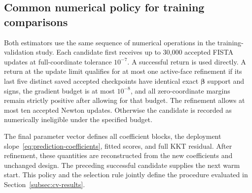 \subsection{Common numerical policy for training comparisons}
\label{subsec:training-solver-policy}
Both estimators use the same sequence of numerical operations in the training-validation study. Each candidate first receives up to 30,000 accepted FISTA updates at full-coordinate tolerance $10^{-7}$. A successful return is used directly. A return at the update limit qualifies for at most one active-face refinement if its last five distinct saved accepted checkpoints have identical exact $\bm{\beta}$ support and signs, the gradient budget is at most $10^{-8}$, and all zero-coordinate margins remain strictly positive after allowing for that budget. The refinement allows at most ten accepted Newton updates. Otherwise the candidate is recorded as numerically ineligible under the specified budget.

The final parameter vector defines all coefficient blocks, the deployment slope~\eqref{eq:prediction-coefficients}, fitted scores, and full KKT residual. After refinement, these quantities are reconstructed from the new coefficients and unchanged design. The preceding successful candidate supplies the next warm start. This policy and the selection rule jointly define the procedure evaluated in Section~\ref{subsec:cv-results}.
